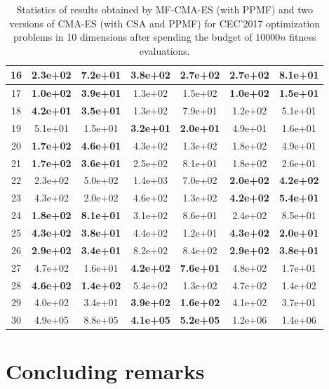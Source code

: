 \documentclass[dvipsnames,format=sigconf,anonymous=false,review=false]{acmart}
\begin{document}
\begin{table}[t!]
{\begin{tabular}{c|c|c|c|c|c|c}
\hline
16 & \textbf{2.3e+02} & \textbf{7.2e+01} & 3.8e+02 & 2.7e+02 & 2.7e+02 & 8.1e+01\\
\hline
17 & \textbf{1.0e+02} & \textbf{3.9e+01} & 1.3e+02 & 1.5e+02 & \textbf{1.0e+02} & \textbf{1.5e+01}\\
\hline
18 & \textbf{4.2e+01} & \textbf{3.5e+01} & 1.3e+02 & 7.9e+01 & 1.2e+02 & 5.1e+01\\
\hline
19 & 5.1e+01 & 1.5e+01 & \textbf{3.2e+01} & \textbf{2.0e+01} & 4.9e+01 & 1.6e+01\\
\hline
20 & \textbf{1.7e+02} & \textbf{4.6e+01} & 4.3e+02 & 1.3e+02 & 1.8e+02 & 4.9e+01\\
\hline
21 & \textbf{1.7e+02} & \textbf{3.6e+01} & 2.5e+02 & 8.1e+01 & 1.8e+02 & 2.6e+01\\
\hline
22 & 2.3e+02 & 5.0e+02 & 1.4e+03 & 7.0e+02 & \textbf{2.0e+02} & \textbf{4.2e+02}\\
\hline
23 & 4.3e+02 & 2.0e+02 & 4.6e+02 & 1.3e+02 & \textbf{4.2e+02} & \textbf{5.4e+01}\\
\hline
24 & \textbf{1.8e+02} & \textbf{8.1e+01} & 3.1e+02 & 8.6e+01 & 2.4e+02 & 8.5e+01\\
\hline
25 & \textbf{4.3e+02} & \textbf{3.8e+01} & 4.4e+02 & 1.2e+01 & \textbf{4.3e+02} & \textbf{2.0e+01}\\
\hline
26 & \textbf{2.9e+02} & \textbf{3.4e+01} & 8.2e+02 & 8.4e+02 & \textbf{2.9e+02} & \textbf{3.8e+01}\\
\hline
27 & 4.7e+02 & 1.6e+01 & \textbf{4.2e+02} & \textbf{7.6e+01} & 4.8e+02 & 1.7e+01\\
\hline
28 & \textbf{4.6e+02} & \textbf{1.4e+02} & 5.4e+02 & 1.3e+02 & 4.7e+02 & 1.4e+02\\
\hline
29 & 4.0e+02 & 3.4e+01 & \textbf{3.9e+02} & \textbf{1.6e+02} & 4.1e+02 & 3.7e+01\\
\hline
30 & 4.9e+05 & 8.8e+05 & \textbf{4.1e+05} & \textbf{5.2e+05} & 1.2e+06 & 1.4e+06\\

\bottomrule
\end{tabular}
}
\caption{Statistics of results obtained by MF-CMA-ES (with PPMF) and two versions of CMA-ES (with CSA and PPMF) for CEC'2017 optimization problems in 10 dimensions after spending the budget of $10000n$ fitness evaluations.}
\label{tab:CEC17-D10}
\end{table}


\section{Concluding remarks}
\end{document}
